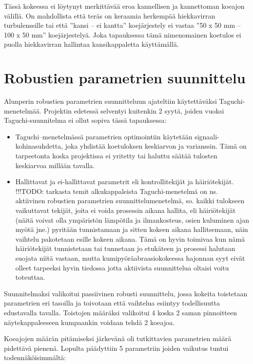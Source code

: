 \documentclass[12pt,a4paper,finnish]{tutthesis}
\newcommand\todo[1]{{\color{red}!!!TODO: #1}} %
\begin{document}
Tässä kokeessa ei löytynyt merkittävää eroa kannellisen ja kannettoman koeajon välillä.
On mahdollista että teräs on keraamia herkempää hiekkavirran turbulenssille tai että ”kansi – ei kantta” koejärjestely ei vastaa ”50 x 50 mm – 100 x 50 mm” koejärjestelyä. Joka tapauksessa tämä nimenomainen koetulos ei puolla hiekkavirran hallintaa kansikappaletta käyttämällä.

\section{Robustien parametrien suunnittelu}

Alunperin robustien parametrien suunnitteluun ajateltiin käytettäväksi
Taguchi-menetelmää. Projektin edetessä selventyi kuitenkin 2 syytä, joiden
vuoksi Taguchi-suunnitelma ei ollut sopiva tässä tapauksessa:

\begin{itemize}
  \item Taguchi–menetelmässä parametrien optimointiin käytetään
signaali-kohinasuhdetta, joka yhdistää koetuloksen keskiarvon ja varianssin. Tämä on tarpeetonta koska projektissa ei
yritetty tai haluttu säätää tulosten keskiarvoa millään tavalla.
  \item Hallittavat ja ei-hallittavat parametrit eli kontrollitekijät ja häiriötekijät.
\todo{tarkasta temit alkukappaleista}
Taguchi-menetelmä on ns. aktiivinen robustien parametrien suunnittelumenetelmä, so. kaikki tulokseen vaikuttavat tekijät, joita ei voida prosessin aikana hallita, eli häiriötekijät (näitä voivat olla ympäristön lämpötila ja ilmankosteus, osien kuluminen ajan myötä jne.) pyritään tunnistamaan ja sitten kokeen aikana hallitsemaan, näin vaihtelu pakotetaan esille kokeen aikana. Tämä on hyvin toimivaa kun nämä häiriötekijät tunnistetaan tai tunnetaan jo etukäteen ja prosessi halutaan suojata niitä vastaan, mutta kumipyöräabraasiokokeessa
hajonnan syyt eivät olleet tarpeeksi hyvin tiedossa jotta aktiivista suunnittelua
oltaisi voitu toteuttaa.
\end{itemize}

Suunnitelmaksi valikoitui passiivinen robusti suunnittelu, jossa kokeita toistetaan parametrien eri tasoilla ja toivotaan että vaihtelua esiintyy todellisuutta edustavalla tavalla. Toistojen määräksi valikoitui 4 koska 2
saman pinnoitteen näytekappaleeseen kumpaankin voidaan tehdä 2 koeajoa.

Koeajojen määrän pitämiseksi järkevänä oli tutkittavien parametrien määrä pidettävä pienenä. Lopulta päädyttiin 5 parametriin joiden vaikutus tuntui todennäköisimmältä:
\end{document}
